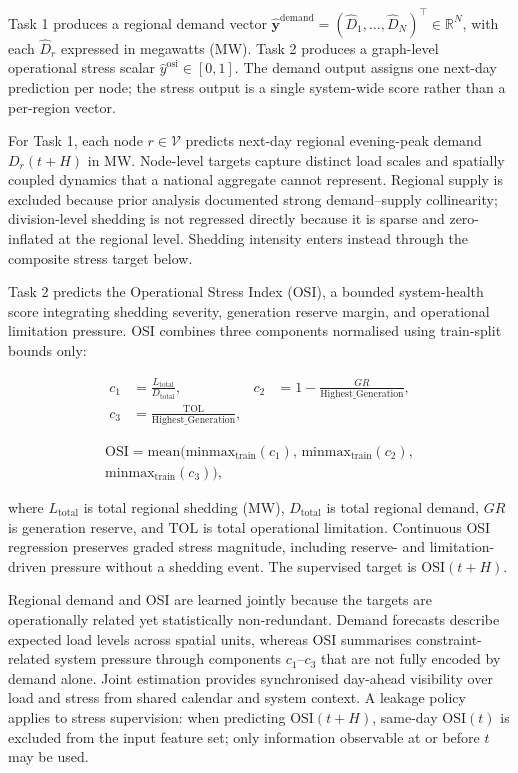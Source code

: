 Task 1 produces a regional demand vector \(\hat{\mathbf{y}}^{\mathrm{demand}} = (\hat{D}_1, \ldots, \hat{D}_N)^\top \in \mathbb{R}^N\), with each \(\hat{D}_r\) expressed in megawatts (MW). Task 2 produces a graph-level operational stress scalar \(\hat{y}^{\mathrm{osi}} \in [0, 1]\). The demand output assigns one next-day prediction per node; the stress output is a single system-wide score rather than a per-region vector.

For Task 1, each node \(r \in \mathcal{V}\) predicts next-day regional evening-peak demand \(D_r(t+H)\) in MW. Node-level targets capture distinct load scales and spatially coupled dynamics that a national aggregate cannot represent. Regional supply is excluded because prior analysis documented strong demand--supply collinearity; division-level shedding is not regressed directly because it is sparse and zero-inflated at the regional level. Shedding intensity enters instead through the composite stress target below.

Task 2 predicts the Operational Stress Index (OSI), a bounded system-health score integrating shedding severity, generation reserve margin, and operational limitation pressure. OSI combines three components normalised using train-split bounds only:

\begin{align}
c_1 &= \frac{L_{\mathrm{total}}}{D_{\mathrm{total}}}, &
c_2 &= 1 - \frac{GR}{\mathrm{Highest\_Generation}}, \nonumber\\
c_3 &= \frac{\mathrm{TOL}}{\mathrm{Highest\_Generation}},
\end{align}

\begin{multline}
\mathrm{OSI} = \mathrm{mean}\bigl(\mathrm{minmax}_{\mathrm{train}}(c_1),\, \mathrm{minmax}_{\mathrm{train}}(c_2),\\
\mathrm{minmax}_{\mathrm{train}}(c_3)\bigr),
\end{multline}

where \(L_{\mathrm{total}}\) is total regional shedding (MW), \(D_{\mathrm{total}}\) is total regional demand, \(GR\) is generation reserve, and \(\mathrm{TOL}\) is total operational limitation. Continuous OSI regression preserves graded stress magnitude, including reserve- and limitation-driven pressure without a shedding event. The supervised target is \(\mathrm{OSI}(t+H)\).

Regional demand and OSI are learned jointly because the targets are operationally related yet statistically non-redundant. Demand forecasts describe expected load levels across spatial units, whereas OSI summarises constraint-related system pressure through components \(c_1\)--\(c_3\) that are not fully encoded by demand alone. Joint estimation provides synchronised day-ahead visibility over load and stress from shared calendar and system context. A leakage policy applies to stress supervision: when predicting \(\mathrm{OSI}(t+H)\), same-day \(\mathrm{OSI}(t)\) is excluded from the input feature set; only information observable at or before \(t\) may be used.

